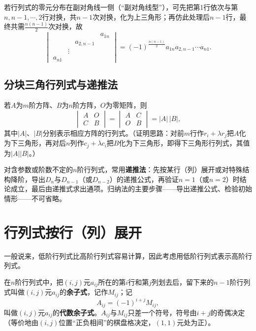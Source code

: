 若行列式的零元分布在副对角线一侧（“副对角线型”），可先把第1行依次与第$n,n-1,\cdots,2$行对换，共$n-1$次对换，化为上三角形；再仿此处理后$n-1$行，最终共需$\frac{n(n-1)}{2}$次对换，故
\[
\begin{vmatrix}
&&&a_{1n}\\&&a_{2,n-1}&\\&\vdots&&\\a_{n1}&&&
\end{vmatrix}
=(-1)^{\frac{n(n-1)}{2}}a_{1n}a_{2,n-1}\cdots a_{n1}.
\]


\subsection{分块三角行列式与递推法}

若$A$为$m$阶方阵、$B$为$n$阶方阵，$O$为零矩阵，则
\[
\begin{vmatrix}A&O\\C&B\end{vmatrix}
=\begin{vmatrix}A&C\\O&B\end{vmatrix}
=|A|\,|B|,
\]
其中$|A|$、$|B|$分别表示相应方阵的行列式。（证明思路：对前$m$行作$r_i+\lambda r_j$把$A$化为下三角形，再对后$n$列作$c_j+\lambda c_i$把$B$化为下三角形，即得下三角形行列式，其值为$|A||B|$。）

对含参数或阶数不定的$n$阶行列式，常用\textbf{递推法}：先按某行（列）展开或对特殊结构降阶，导出$D_n$与$D_{n-1}$（或$D_{n-2}$）的递推公式，再验证$n=1$（或$n=2$）时结论成立，最后由递推式求出通项。归纳法的主要步骤——导出递推公式、检验初始情形——不可省略。

\section{行列式按行（列）展开}

一般说来，低阶行列式比高阶行列式容易计算，因此考虑用低阶行列式表示高阶行列式。

在$n$阶行列式中，把$(i,j)$元$a_{ij}$所在的第$i$行和第$j$列划去后，留下来的$n-1$阶行列式叫做$(i,j)$元$a_{ij}$的\textbf{余子式}，记作$M_{ij}$；记
\[
A_{ij}=(-1)^{i+j}M_{ij},
\]
叫做$(i,j)$元$a_{ij}$的\textbf{代数余子式}。$A_{ij}$与$M_{ij}$只差一个符号，符号由$i+j$的奇偶决定（等价地由$(i,j)$位置“正负相间”的棋盘格决定，$(1,1)$元处为正）。

